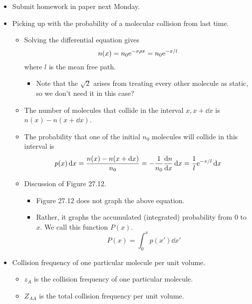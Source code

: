 \documentclass[../notes.tex]{subfiles}
\begin{document}
\begin{itemize}
    \item {}Submit homework in paper next Monday.
    \item Picking up with the probability of a molecular collision from last time.
    \begin{itemize}
        \item Solving the differential equation gives
        \begin{equation*}
            n(x) = n_0\e[-\sigma\rho x]
            = n_0\e[-x/l]
        \end{equation*}
        where $l$ is the mean free path.
        \begin{itemize}
            \item Note that the $\sqrt{2}$ arises from treating every other molecule as static, so we don't need it in this case?
        \end{itemize}
        \item The number of molecules that collide in the interval $x,x+\dd{x}$ is $n(x)-n(x+\dd{x})$.
        \item The probability that one of the initial $n_0$ molecules will collide in this interval is
        \begin{equation*}
            p(x)\dd{x} = \frac{n(x)-n(x+\dd{x})}{n_0}
            = -\frac{1}{n_0}\dv{n}{x}\dd{x}
            = \frac{1}{l}\e[-x/l]\dd{x}
        \end{equation*}
        \item Discussion of Figure 27.12.
        \begin{itemize}
            \item Figure 27.12 does not graph the above equation.
            \item Rather, it graphs the accumulated (integrated) probability from 0 to $x$. We call this function $P(x)$.
            \begin{equation*}
                P(x) = \int_0^xp(x')\dd{x'}
            \end{equation*}
        \end{itemize}
    \end{itemize}
    \item Collision frequency of one particular molecule per unit volume.
    \begin{itemize}
        \item $z_A$ is the collision frequency of one particular molecule.
        \item $Z_{AA}$ is the total collision frequency per unit volume.

\end{itemize}
\end{itemize}
\end{document}
